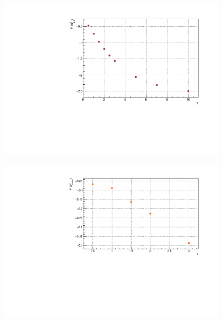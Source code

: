 \begin{figure}[H]
    \centering
    \includegraphics[scale=0.7]{Figures/8sites_comparison/8sites_gradLM_2and3VSgamma.pdf}
    \caption{}
    \label{fig:my_label}
\end{figure}

\begin{figure}[H]
    \centering
    \includegraphics[scale=0.7]{Figures/12sites/12sites_gradLM_centerChainVSgamma.pdf}
    \caption{}
    \label{fig:my_label}
\end{figure}


